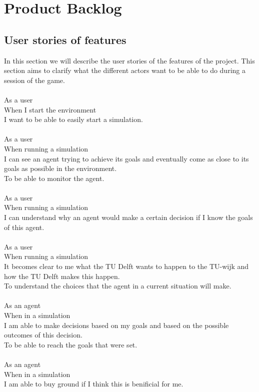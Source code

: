 \section{Product Backlog}
\subsection{User stories of features}

In this section we will describe the user stories of the features of the project. This section aims to clarify what the different actors want to be able to do during a session of the game.\\
\\
As a user\\
When I start the environment\\
I want to be able to easily start a simulation.\\
\\
As a user\\
When running a simulation\\
I can see an agent trying to achieve its goals and eventually come as close to its goals as possible in the environment.\\
To be able to monitor the agent.\\
\\
As a user\\
When running a simulation\\
I can understand why an agent would make a certain decision if I know the goals of this agent.\\
\\
As a user\\
When running a simulation\\
It becomes clear to me what the TU Delft wants to happen to the TU-wijk and how the TU Delft makes this happen.\\
To understand the choices that the agent in a current situation will make.\\
\\
As an agent\\
When in a simulation\\
I am able to make decisions based on my goals and based on the possible outcomes of this decision.\\
To be able to reach the goals that were set.\\
\\
As an agent\\
When in a simulation\\
I am able to buy ground if I think this is benificial for me.\\
